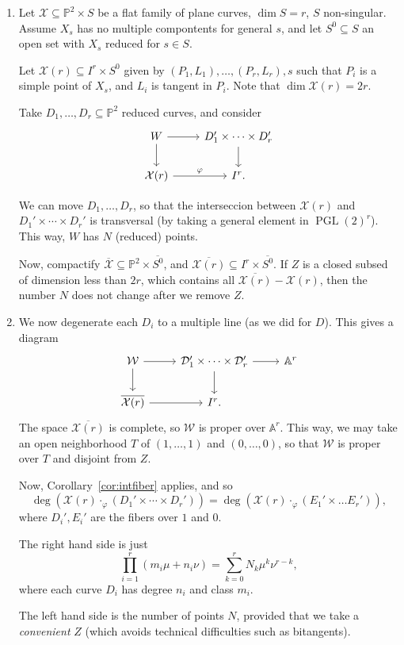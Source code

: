 \documentclass[leqno, openany]{memoir}
\theoremstyle{definition}
\theoremstyle{remark}
\theoremstyle{plain}
\theoremstyle{definition}
\theoremstyle{remark}
\newcommand{\A}{\mathbb{A}}
\renewcommand{\P}{\mathbb{P}}
\newcommand{\mc}[1]{\mathcal{#1}}
\begin{document}
\begin{enumerate}
The projection from $P_0$ to $M$ gives a family $\mathcal{D} \to \mathbb{A}^1$ with $\mathcal{D}_1=[D'], \mathcal{D}_0 = n[M']+\sum [Q_i']$. (There is a explicit computation in \textsection~10.4.) 
    \item Let $\mathcal{X} \subseteq \P^2 \times S$ be a flat family of plane curves, $\dim S=r$, $S$ non-singular. Assume $X_s$ has no multiple compontents for general $s$, and let $S^0 \subseteq S$ an open set with $X_s$ reduced for $s \in S$. 

Let $\mc{X}(r)\subseteq I^r \times S^0$ given by $(P_1, L_1), \dots, (P_r, L_r), s$ such that $P_i$ is a simple point of $X_s$, and $L_i$ is tangent in $P_i$. Note that $\dim \mc{X}(r)=2r$.

Take $D_1, \dots, D_r \subseteq \P^2$ reduced curves, and consider
\[ \begin{tikzcd} W \arrow[r] \arrow[d] & D_1' \times \cdots \times D_r' \arrow[d] \\ \mc{X}(r) \arrow[r, "\varphi"] & I^r. \end{tikzcd} \]

We can move $D_1, \dots, D_r$, so that the interseccion between $\mc{X}(r)$ and $D_1' \times \cdots \times D_r'$ is transversal (by taking a general element in ${ \operatorname{PGL}(2) }^r$). This way, $W$ has $N$ (reduced) points. 

Now, compactify $\overline{\mc{X}} \subseteq \P^2 \times \overline{S^0}$, and $\overline{\mc{X}(r)}\subseteq I^r \times \overline{S^0}$. If $Z$ is a closed subsed of dimension less than $2r$, which contains all $\overline{\mc{X}(r)}-\mc{X}(r)$, then the number $N$ does not change after we remove $Z$.
    \item We now degenerate each $D_i$ to a multiple line (as we did for $D$). This gives a diagram
\[ \begin{tikzcd} \mc{W} \arrow[r] \arrow[d] & \mc{D}_1' \times \cdots \times \mc{D}_r' \arrow[r] \arrow[d] & \A^r \\ \overline{\mc{X}(r)} \arrow[r]& I^r. \end{tikzcd} \]
The space $\overline{\mc{X}(r)}$ is complete, so $\mc{W}$ is proper over $\A^r$. This way, we may take an open neighborhood $T$ of $(1, \dots, 1)$ and $(0, \dots, 0)$, so that $\mc{W}$ is proper over $T$ and disjoint from $Z$. 

Now, Corollary~\ref{cor:intfiber} applies, and so
\[ \deg(\mc{X}(r) \cdot_\varphi (D_1' \times \cdots \times D_r')) = \deg(\mc{X}(r) \cdot_\varphi (E_1' \times \dots E_r')), \]
where $D_i', E_i'$ are the fibers over $1$ and $0$.

The right hand side is just
\[ \prod_{i=1}^r (m_i \mu + n_i \nu) = \sum_{k=0}^r N_k \mu^k \nu^{r-k}, \]
where each curve $D_i$ has degree $n_i$ and class $m_i$. 

The left hand side is the number of points $N$, provided that we take a \emph{convenient} $Z$ (which avoids technical difficulties such as bitangents). 
\end{enumerate}
\end{document}
